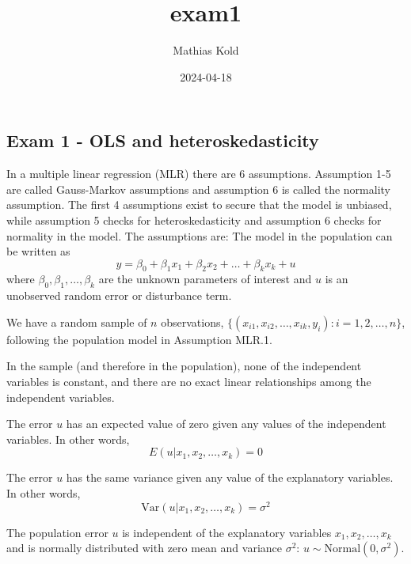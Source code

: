 \documentclass[
]{article}
\title{exam1}
\author{Mathias Kold}
\date{2024-04-18}
\begin{document}
\maketitle

\subsection{Exam 1 - OLS and
heteroskedasticity}\label{exam-1---ols-and-heteroskedasticity}

In a multiple linear regression (MLR) there are 6 assumptions.
Assumption 1-5 are called Gauss-Markov assumptions and assumption 6 is
called the normality assumption. The first 4 assumptions exist to secure
that the model is unbiased, while assumption 5 checks for
heteroskedasticity and assumption 6 checks for normality in the model.
The assumptions are:  The model in the
population can be written as
\[y = \beta_0 + \beta_1 x_1 + \beta_2 x_2 + \ldots + \beta_k x_k + u\]
where \(\beta_0, \beta_1, \ldots, \beta_k\) are the unknown parameters
of interest and \(u\) is an unobserved random error or disturbance term.


We have a random sample of \(n\) observations,
\(\{(x_{i1}, x_{i2}, \ldots, x_{ik}, y_i) : i = 1, 2, \ldots, n\}\),
following the population model in Assumption MLR.1.


In the sample (and therefore in the population), none of the independent
variables is constant, and there are no exact linear relationships among
the independent variables.


The error \(u\) has an expected value of zero given any values of the
independent variables. In other words,
\[E(u | x_1, x_2, \ldots, x_k) = 0\]


The error \(u\) has the same variance given any value of the explanatory
variables. In other words,
\[\text{Var}(u | x_1, x_2, \ldots, x_k) = \sigma^2\]


The population error \(u\) is independent of the explanatory variables
\(x_1, x_2, \ldots, x_k\) and is normally distributed with zero mean and
variance \(\sigma^2\): \(u \sim \text{Normal}(0, \sigma^2)\).
\end{document}
